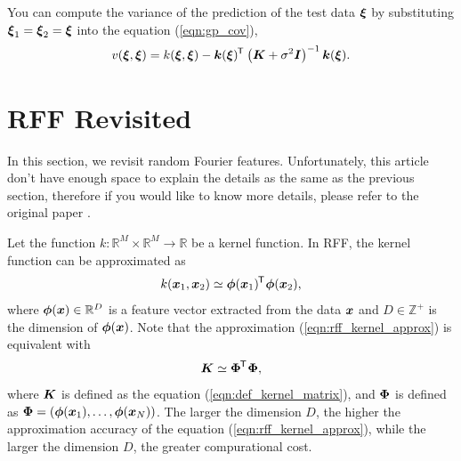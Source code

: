 \documentclass[twocolumn,a4paper,10pt]{article}
\begin{document}
You can compute the variance of the prediction of the test data $\boldsymbol{\xi}$
by substituting $\boldsymbol{\xi}_1 = \boldsymbol{\xi}_2 = \boldsymbol{\xi}$ into the equation (\ref{eqn:gp_cov}),
\begin{equation}
    v (\boldsymbol{\xi}, \boldsymbol{\xi}) = k (\boldsymbol{\xi}, \boldsymbol{\xi})
    - \boldsymbol{k} (\boldsymbol{\xi})^{\mkern-1.5mu\mathsf{T}}\hspace{0.5pt} \left( \boldsymbol{K} + \sigma^2 \boldsymbol{I} \right)^{-1} \boldsymbol{k} (\boldsymbol{\xi}).
\end{equation}


\section{RFF Revisited}\titlebar

In this section, we revisit random Fourier features. Unfortunately, this article don't have
enough space to explain the details as the same as the previous section, therefore if you
would like to know more details, please refer to the original paper \cite{Rahimi2007}.

Let the function $k: \mathbb{R}^M \times \mathbb{R}^M \to \mathbb{R}$ be a kernel function.
In RFF, the kernel function can be approximated as
\begin{equation}
    k (\boldsymbol{x}_1, \boldsymbol{x}_2) \simeq \boldsymbol{\phi}(\boldsymbol{x}_1)^{\mkern-1.5mu\mathsf{T}}\hspace{0.5pt} \boldsymbol{\phi}(\boldsymbol{x}_2),
    \label{eqn:rff_kernel_approx}
\end{equation}
where $\boldsymbol{\phi}(\boldsymbol{x}) \in \mathbb{R}^D$ is a feature vector extracted from 
the data $\boldsymbol{x}$ and $D \in \mathbb{Z}^+$ is the dimension of $\boldsymbol{\phi}(\boldsymbol{x})$.
Note that the approximation (\ref{eqn:rff_kernel_approx}) is equivalent with
\begin{equation}
    \boldsymbol{K} \simeq \boldsymbol{\Phi}^{\mkern-1.5mu\mathsf{T}}\hspace{0.5pt} \boldsymbol{\Phi},
    \label{eqn:rff_kernel_approx_matrix}
\end{equation}
where $\boldsymbol{K}$ is defined as the equation (\ref{eqn:def_kernel_matrix}), and $\boldsymbol{\Phi}$ is defined
as $\boldsymbol{\Phi} = (\boldsymbol{\phi} (\boldsymbol{x}_1), \ldots, \boldsymbol{\phi} (\boldsymbol{x}_N))$.
The larger the dimension $D$, the higher the approximation accuracy of the equation
(\ref{eqn:rff_kernel_approx}), while the larger the dimension $D$, the greater compurational cost.
\end{document}
